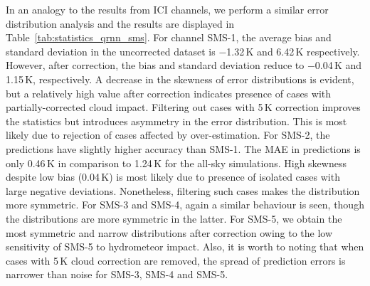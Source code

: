 \documentclass[amt, manuscript]{copernicus}
\begin{document}
In an analogy to the results from ICI channels, we perform a similar error distribution analysis  and the results are displayed in Table~\ref{tab:statistics_qrnn_sms}. For channel SMS-1, the average bias and standard deviation in the uncorrected dataset is $-$1.32\,K and 6.42\,K respectively. However, after correction, the bias and standard deviation reduce to $-$0.04\,K and 1.15\,K, respectively. A decrease in the skewness of error distributions is evident, but a relatively high value after correction indicates presence of cases with partially-corrected cloud impact. Filtering out cases with 5\,K correction improves the statistics but introduces asymmetry in the error distribution. This is most likely due to rejection of cases affected by over-estimation. For SMS-2, the predictions have slightly higher accuracy than SMS-1. The MAE in predictions is only 0.46\,K in comparison to 1.24\,K for the all-sky simulations. High skewness despite low bias (0.04\,K) is most likely due to presence of isolated cases with large negative deviations. Nonetheless, filtering such cases makes the distribution more symmetric. For SMS-3 and SMS-4, again a similar behaviour is seen, though the distributions are more symmetric in the latter. For SMS-5, we obtain the most symmetric and narrow distributions after correction owing to the low sensitivity of SMS-5 to hydrometeor impact.  Also, it is worth to noting that when cases with 5\,K cloud correction are removed, the spread of prediction errors is narrower than noise for SMS-3, SMS-4 and SMS-5. 
\end{document}
